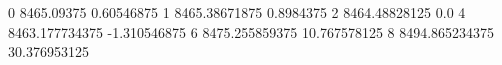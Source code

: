 0 8465.09375 0.60546875
1 8465.38671875 0.8984375
2 8464.48828125 0.0
4 8463.177734375 -1.310546875
6 8475.255859375 10.767578125
8 8494.865234375 30.376953125

